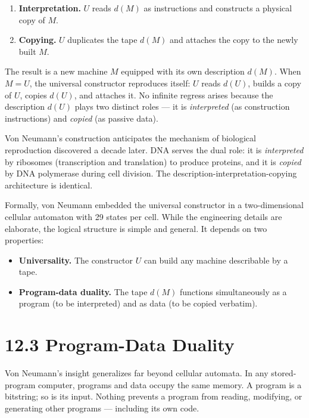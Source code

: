 \begin{enumerate}
  \item \textbf{Interpretation.} $U$ reads $d(M)$ as instructions and constructs a physical copy of $M$.
  \item \textbf{Copying.} $U$ duplicates the tape $d(M)$ and attaches the copy to the newly built $M$.
\end{enumerate}

The result is a new machine $M$ equipped with its own description $d(M)$. When $M = U$, the universal constructor reproduces itself: $U$ reads $d(U)$, builds a copy of $U$, copies $d(U)$, and attaches it. No infinite regress arises because the description $d(U)$ plays two distinct roles --- it is \textit{interpreted} (as construction instructions) and \textit{copied} (as passive data).

\begin{remark}
Von Neumann's construction anticipates the mechanism of biological reproduction discovered a decade later. DNA serves the dual role: it is \textit{interpreted} by ribosomes (transcription and translation) to produce proteins, and it is \textit{copied} by DNA polymerase during cell division. The description-interpretation-copying architecture is identical.

Formally, von Neumann embedded the universal constructor in a two-dimensional cellular automaton with 29 states per cell. While the engineering details are elaborate, the logical structure is simple and general. It depends on two properties:
\end{remark}

\begin{itemize}
  \item \textbf{Universality.} The constructor $U$ can build any machine describable by a tape.
  \item \textbf{Program-data duality.} The tape $d(M)$ functions simultaneously as a program (to be interpreted) and as data (to be copied verbatim).
\end{itemize}

\section{12.3 Program-Data Duality}

Von Neumann's insight generalizes far beyond cellular automata. In any stored-program computer, programs and data occupy the same memory. A program is a bitstring; so is its input. Nothing prevents a program from reading, modifying, or generating other programs --- including its own code.

